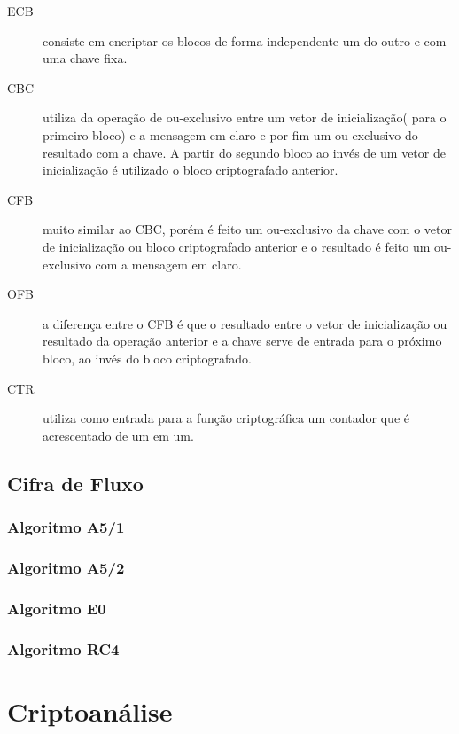 \begin{description}
\item [ECB]consiste em encriptar os blocos de forma independente um do outro e com uma chave fixa.
\item[CBC] utiliza da operação de ou-exclusivo entre um vetor de inicialização( para o primeiro bloco) e a mensagem em claro e por fim um ou-exclusivo do resultado com a chave. A partir do segundo bloco ao invés de um vetor de inicialização é utilizado o bloco criptografado anterior.
\item[CFB] muito similar ao CBC, porém é feito um ou-exclusivo da chave com o vetor de inicialização ou bloco criptografado anterior e o resultado é feito um ou-exclusivo com a mensagem em claro.
\item[OFB] a diferença entre o CFB é que o resultado entre o vetor de inicialização ou resultado da operação anterior e a chave serve de entrada para o próximo bloco, ao invés do bloco criptografado.
\item[CTR] utiliza como entrada para a função criptográfica um contador que é acrescentado de um em um. 
\end{description}



\subsection{Cifra de Fluxo}
\label{stream-cipher}

\subsubsection{Algoritmo A5/1}
\label{algorithm-a51}

\subsubsection{Algoritmo A5/2}
\label{algorithm-a52}

\subsubsection{Algoritmo E0}
\label{algorithm-e0}

\subsubsection{Algoritmo RC4}
\label{algorithm-rc4}

\section{Criptoanálise}
